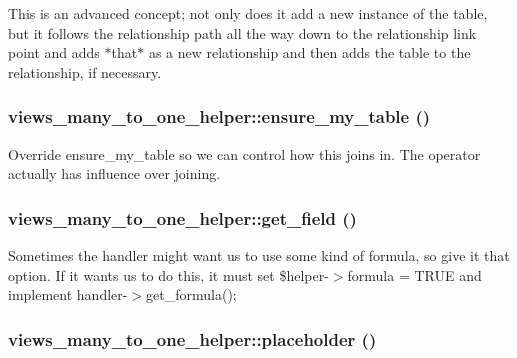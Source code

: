 This is an advanced concept; not only does it add a new instance of the table, but it follows the relationship path all the way down to the relationship link point and adds $\ast$that$\ast$ as a new relationship and then adds the table to the relationship, if necessary. \hypertarget{classviews__many__to__one__helper_a5fdd8b532ced88b77fdd90fdb69e1ced}{
\subsubsection[{ensure\_\-my\_\-table}]{\setlength{\rightskip}{0pt plus 5cm}views\_\-many\_\-to\_\-one\_\-helper::ensure\_\-my\_\-table ()}}
\label{classviews__many__to__one__helper_a5fdd8b532ced88b77fdd90fdb69e1ced}
Override ensure\_\-my\_\-table so we can control how this joins in. The operator actually has influence over joining. \hypertarget{classviews__many__to__one__helper_af428c1a384a446883d9c862e1a5a35d1}{
\subsubsection[{get\_\-field}]{\setlength{\rightskip}{0pt plus 5cm}views\_\-many\_\-to\_\-one\_\-helper::get\_\-field ()}}
\label{classviews__many__to__one__helper_af428c1a384a446883d9c862e1a5a35d1}
Sometimes the handler might want us to use some kind of formula, so give it that option. If it wants us to do this, it must set \$helper-\/$>$formula = TRUE and implement handler-\/$>$get\_\-formula(); \hypertarget{classviews__many__to__one__helper_ac1809fab46a1542250cff68bace8497e}{
\subsubsection[{placeholder}]{\setlength{\rightskip}{0pt plus 5cm}views\_\-many\_\-to\_\-one\_\-helper::placeholder ()}}
\label{classviews__many__to__one__helper_ac1809fab46a1542250cff68bace8497e}
